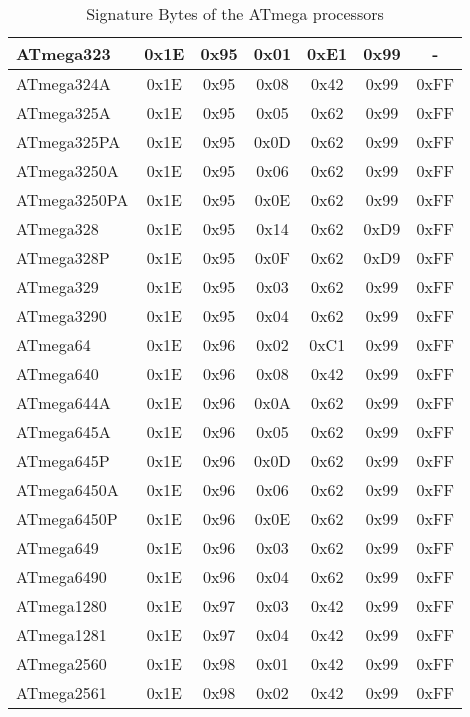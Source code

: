 \begin{table}[H]
\begin{center}
\begin{tabular}{| l | c | c | c || c | c | c |}
    \hline
ATmega323  & 0x1E & 0x95  & 0x01 & 0xE1 & 0x99 &  -  \\
    \hline
ATmega324A & 0x1E & 0x95  & 0x08 & 0x42 & 0x99 & 0xFF \\
    \hline
ATmega325A & 0x1E & 0x95  & 0x05 & 0x62 & 0x99 & 0xFF \\
    \hline
ATmega325PA & 0x1E & 0x95  & 0x0D & 0x62 & 0x99 & 0xFF \\
    \hline
ATmega3250A & 0x1E & 0x95  & 0x06 & 0x62 & 0x99 & 0xFF \\
    \hline
ATmega3250PA & 0x1E & 0x95  & 0x0E & 0x62 & 0x99 & 0xFF \\
    \hline
ATmega328  & 0x1E & 0x95  & 0x14 & 0x62 & 0xD9 & 0xFF \\
    \hline
ATmega328P & 0x1E & 0x95  & 0x0F & 0x62 & 0xD9 & 0xFF \\
    \hline
ATmega329  & 0x1E & 0x95  & 0x03 & 0x62 & 0x99 & 0xFF \\
    \hline
ATmega3290 & 0x1E & 0x95  & 0x04 & 0x62 & 0x99 & 0xFF \\
    \hline
ATmega64   & 0x1E & 0x96  & 0x02 & 0xC1 & 0x99 & 0xFF \\
    \hline
ATmega640  & 0x1E & 0x96  & 0x08 & 0x42 & 0x99 & 0xFF \\
    \hline
ATmega644A & 0x1E & 0x96  & 0x0A & 0x62 & 0x99 & 0xFF \\
    \hline
ATmega645A & 0x1E & 0x96  & 0x05 & 0x62 & 0x99 & 0xFF \\
    \hline
ATmega645P & 0x1E & 0x96  & 0x0D & 0x62 & 0x99 & 0xFF \\
    \hline
ATmega6450A & 0x1E & 0x96  & 0x06 & 0x62 & 0x99 & 0xFF \\
    \hline
ATmega6450P & 0x1E & 0x96  & 0x0E & 0x62 & 0x99 & 0xFF \\
    \hline
ATmega649  & 0x1E & 0x96  & 0x03 & 0x62 & 0x99 & 0xFF \\
    \hline
ATmega6490 & 0x1E & 0x96  & 0x04 & 0x62 & 0x99 & 0xFF \\
    \hline
ATmega1280 & 0x1E & 0x97  & 0x03 & 0x42 & 0x99 & 0xFF \\
    \hline
ATmega1281 & 0x1E & 0x97  & 0x04 & 0x42 & 0x99 & 0xFF \\
    \hline
ATmega2560 & 0x1E & 0x98  & 0x01 & 0x42 & 0x99 & 0xFF \\
    \hline
ATmega2561 & 0x1E & 0x98  & 0x02 & 0x42 & 0x99 & 0xFF \\
    \hline
    \end{tabular}
  \end{center}
  \caption{Signature Bytes of the ATmega processors}
  \label{tab:megaSignature}
\end{table}


